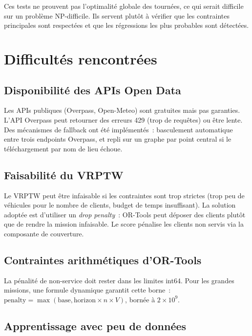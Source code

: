\documentclass[a4paper, 12pt, twoside]{article}
\begin{document}
Ces tests ne prouvent pas l'optimalit\'{e} globale des tourn\'{e}es, ce qui serait difficile
sur un probl\`{e}me NP-difficile. Ils servent plut\^{o}t \`{a} v\'{e}rifier que les contraintes
principales sont respect\'{e}es et que les r\'{e}gressions les plus probables sont d\'{e}tect\'{e}es.

\section{Difficult\'{e}s rencontr\'{e}es}

\subsection{Disponibilit\'{e} des APIs Open Data}

Les APIs publiques (Overpass, Open-Meteo) sont gratuites mais pas garanties. L'API Overpass
peut retourner des erreurs 429 (trop de requ\^{e}tes) ou \^{e}tre lente. Des m\'{e}canismes
de fallback ont \'{e}t\'{e} impl\'{e}ment\'{e}s~: basculement automatique entre trois endpoints
Overpass, et repli sur un graphe par point central si le t\'{e}l\'{e}chargement par nom de lieu
\'{e}choue.

\subsection{Faisabilit\'{e} du VRPTW}

Le VRPTW peut \^{e}tre infaisable si les contraintes sont trop strictes (trop peu de v\'{e}hicules
pour le nombre de clients, budget de temps insuffisant). La solution adopt\'{e}e est d'utiliser
un \textit{drop penalty}~: OR-Tools peut d\'{e}poser des clients plut\^{o}t que de rendre la
mission infaisable. Le score p\'{e}nalise les clients non servis via la composante de couverture.

\subsection{Contraintes arithm\'{e}tiques d'OR-Tools}

La p\'{e}nalit\'{e} de non-service doit rester dans les limites int64. Pour les grandes missions,
une formule dynamique garantit cette borne~: $\text{penalty} = \max(\text{base}, \text{horizon} \times n \times V)$,
born\'{e}e \`{a} $2 \times 10^9$.

\subsection{Apprentissage avec peu de donn\'{e}es}
\end{document}

